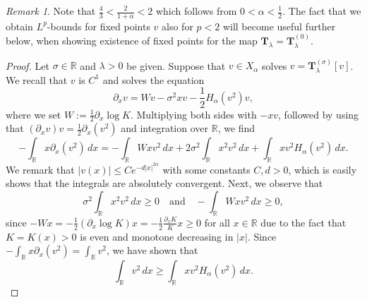 \documentclass[reqno,10pt,a4paper]{amsart}
\theoremstyle{definition}
\theoremstyle{definition}
\theoremstyle{remark}
\theoremstyle{remark}
\newtheorem{remark}{Remark}[section]
\numberwithin{equation}{section}
\newcommand{\R}{\mathbb{R}}
\newcommand{\pt}{\partial}
\newcommand{\Ts}{\mathbf{T}}
\newcommand{\Tss}{\mathbf{T}^{(\sigma)}_\lambda}
\begin{document}
\begin{remark}
Note that $\frac{4}{3} < \frac{2}{1+\alpha} < 2$ which follows from $0 < \alpha < \frac{1}{2}$. The fact that we obtain $L^p$-bounds for fixed points $v$ also for $p < 2$ will become useful further below, when showing existence of fixed points for the map $\mathbf{T}_\lambda=\Ts^{(0)}_\lambda$. 
\end{remark}

\begin{proof}
   Let $\sigma \in \R$  and $\lambda > 0$ be given. Suppose that $v \in X_\alpha$ solves $v = \Tss[v]$.  We recall that $v$ is  $C^1$ and solves the equation
    \begin{equation}
        \partial_x v= W v -\sigma^2 x v - \frac{1}{2} H_\alpha\left(v^2\right)v,
    \end{equation}
    where we set $W := \frac{1}{2} \pt_x \log K$. Multiplying both sides with $-xv$, followed by using that $(\partial_x v)v = \frac{1}{2} \partial_x\left(v^2\right)$ and integration over $\mathbb{R}$, we find 
    \begin{equation}
        -\int_{\mathbb{R}} x \partial_x (v^2) \, dx = -\int_{\R} W x v^2 \, dx + 2  \sigma^2 \int_{\mathbb{R}} x^2 v^2 \, dx + \int_{\mathbb{R}} x v^2 H_\alpha(v^2) \, dx.
    \end{equation}
    We remark that $|v(x)| \leq C e^{-d |x|^{2 \alpha}}$ with some constants $C, d > 0$, which is easily shows that the integrals are absolutely convergent. Next, we observe that 
    $$
    \sigma^2 \int_\mathbb{R} x^2 v^2 \, dx \geq 0 \quad \mbox{and} \quad - \! \int_\R W x v^2 \, dx \geq 0,
    $$ 
    since $-W x = -\frac{1}{2} (\pt_x \log K) x = -\frac{1}{2} \frac{\pt_x K}{K} x \geq 0$ for all $x \in \R$ due to the fact that $K=K(x) >0$ is even and monotone decreasing in $|x|$. Since $-\int_\R x \pt_x(v^2) = \int_\R v^2$, we have shown that
    \begin{equation} \label{ineq:HLS_poho}
        \int_{\mathbb{R}} v^2 \, dx \geq \int_{\mathbb{R}} x v^2 H_{\alpha}(v^2) \, dx.
    \end{equation}
    

\end{proof}
\end{document}
